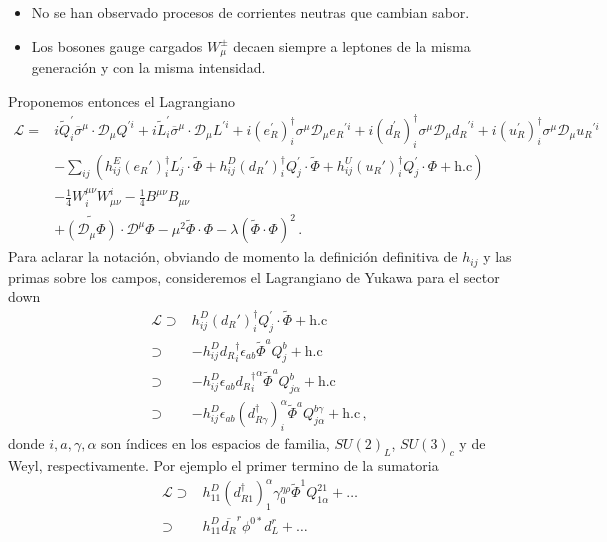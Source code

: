 \begin{frame}
\begin{itemize} %
\item No se han observado procesos de corrientes neutras que cambian sabor.
\item Los bosones gauge cargados $W_\mu^\pm$ decaen siempre a leptones de la misma generación y con la misma intensidad.
\end{itemize} %


Proponemos entonces el Lagrangiano
\begin{align}
\label{eq:265qft} 
    \mathcal{L}=&i \widetilde{Q}^{\prime}_i\overline{\sigma}^\mu\cdot \mathcal{D}_\mu Q^{\prime i}+i\widetilde{ L}^{\prime}_i\overline{\sigma}^\mu\cdot \mathcal{D}_\mu L^{\prime i}+
i\left( e_R^{\prime} \right)^{\dagger}_i\sigma^\mu\mathcal{D}_\mu {e_R}^{\prime i}+i(d_R^{\prime})^{\dagger}_i\sigma^\mu\mathcal{D}_\mu {d_R}^{\prime i}+i(u_R^{\prime})^{\dagger}_i\sigma^\mu\mathcal{D}_\mu {u_R}^{\prime i}
\nonumber\\
     &- \sum_{ij}\left( h_{ij}^E (e_R')^{\dagger}_i{L}^{\prime}_j\cdot \widetilde{\Phi}  
+h_{ij}^D (d_R')^{\dagger}_i{Q}^{\prime}_j\cdot \widetilde{\Phi}  
+h_{ij}^U(u_R')^{\dagger}_i Q^{\prime}_j\cdot \Phi+\text{h.c} \right)\nonumber\\
     &-\tfrac{1}{4}W^{\mu\nu}_i W_{\mu\nu}^i-\tfrac{1}{4}B^{\mu\nu} B_{\mu\nu}\nonumber\\
     &+\widetilde{\left( \mathcal{D}_\mu{\Phi} \right)}\cdot\mathcal{D}^\mu\Phi-\mu^2\widetilde{\Phi}\cdot\Phi-\lambda \left( \widetilde{\Phi}\cdot\Phi \right)^2\,.
\end{align}
Para aclarar la notación, obviando de momento la definición definitiva de $h_{ij}$ y las primas sobre los campos, consideremos el Lagrangiano de Yukawa para el sector down
\begin{align}
  \label{eq:264qft}
  \mathcal{L}\supset&h_{ij}^D (d_R')^{\dagger}_i{Q}^{\prime}_j\cdot \widetilde{\Phi}+\text{h.c}\nonumber\\
\supset&-h^D_{ij}{d_R}^{\dagger}_i\epsilon_{ab}\widetilde{\Phi}^aQ_j^b+\text{h.c}\nonumber\\
\supset&-h^D_{ij}\epsilon_{ab}{{d_R}^{\dagger}_i}^\alpha\widetilde{\Phi}^aQ_{j\alpha}^b+\text{h.c}\nonumber\\
\supset&-h^D_{ij}\epsilon_{ab}{(d_{R\gamma}^\dagger)}_i^\alpha\widetilde{\Phi}^aQ_{j\alpha}^{b\gamma}+\text{h.c}\,,
\end{align}
donde $i,a,\gamma,\alpha$ son índices en los espacios de familia, $SU(2)_L$, $SU(3)_c$ y de Weyl, respectivamente. Por ejemplo el primer termino de la sumatoria 
\begin{align}
\mathcal{L}\supset&h^D_{11}{(d_{R1}^\dagger)}_1^{\alpha}\gamma_0^{\eta\rho}\widetilde{\Phi}^1Q_{1\alpha}^{21}+\ldots\nonumber\\
\supset&h^D_{11}\overline{d_R}^r\phi^{0*}d_{L}^r+\ldots\,
\end{align}


\end{frame}
